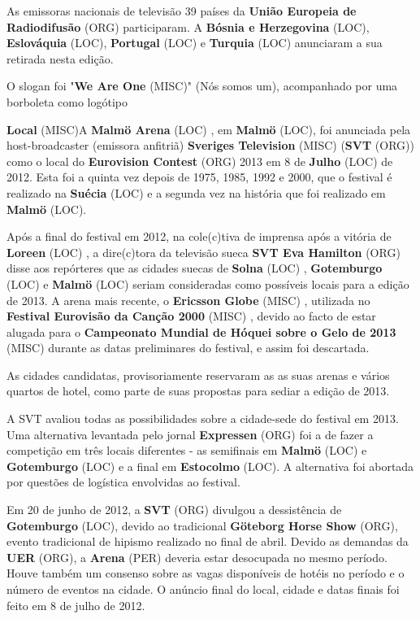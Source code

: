 \documentclass[12pt,a4paper]{article}
\begin{document}
As emissoras nacionais de televisão 39 países da \textbf{União Europeia de Radiodifusão} (ORG) participaram. A \textbf{Bósnia e Herzegovina} (LOC), \textbf{Eslováquia} (LOC), \textbf{Portugal} (LOC) e \textbf{Turquia} (LOC) anunciaram a sua retirada nesta edição.

O slogan foi "\textbf{We Are One} (MISC)" (Nós somos um), acompanhado por uma borboleta como logótipo



\textbf{Local} (MISC)A \textbf{Malmö Arena} (LOC) , em \textbf{Malmö} (LOC), foi anunciada pela host-broadcaster (emissora anfitriã) \textbf{Sveriges Television} (MISC) (\textbf{SVT} (ORG)) como o local do \textbf{Eurovision Contest} (ORG) 2013 em 8 de \textbf{Julho} (LOC) de 2012. Esta foi a quinta vez depois de 1975, 1985, 1992 e 2000, que o festival é realizado na \textbf{Suécia} (LOC) e a segunda vez na história que foi realizado em \textbf{Malmö} (LOC).

Após a final do festival em 2012, na cole(c)tiva de imprensa após a vitória de \textbf{Loreen} (LOC) , a dire(c)tora da televisão sueca \textbf{SVT Eva Hamilton} (ORG) disse aos repórteres que as cidades suecas de \textbf{Solna} (LOC) , \textbf{Gotemburgo} (LOC) e \textbf{Malmö} (LOC) seriam consideradas como possíveis locais para a edição de 2013. A arena mais recente, o \textbf{Ericsson Globe} (MISC) , utilizada no \textbf{Festival Eurovisão da Canção 2000} (MISC) , devido ao facto de estar alugada para o \textbf{Campeonato Mundial de Hóquei sobre o Gelo de 2013} (MISC) durante as datas preliminares do festival, e assim foi descartada.

As cidades candidatas, provisoriamente reservaram as as suas arenas e vários quartos de hotel, como parte de suas propostas para sediar a edição de 2013.

A SVT avaliou todas as possibilidades sobre a cidade-sede do festival em 2013. Uma alternativa levantada pelo jornal \textbf{Expressen} (ORG) foi a de fazer a competição em três locais diferentes - as semifinais em \textbf{Malmö} (LOC) e \textbf{Gotemburgo} (LOC) e a final em \textbf{Estocolmo} (LOC). A alternativa foi abortada por questões de logística envolvidas ao festival.

Em 20 de junho de 2012, a \textbf{SVT} (ORG) divulgou a dessistência de \textbf{Gotemburgo} (LOC), devido ao tradicional \textbf{Göteborg Horse Show} (ORG), evento tradicional de hipismo realizado no final de abril. Devido as demandas da \textbf{UER} (ORG), a \textbf{Arena} (PER) deveria estar desocupada no mesmo período. Houve também um consenso sobre as vagas disponíveis de hotéis no período e o número de eventos na cidade. O anúncio final do local, cidade e datas finais foi feito em 8 de julho de 2012.
\end{document}
